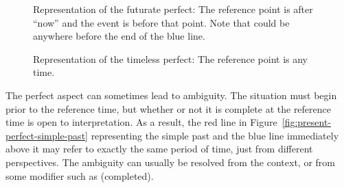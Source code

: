 \begin{figure}
    \caption{Representation of the futurate perfect:  The reference point is after ``now'' and the event is before that point. Note that  could be anywhere before the end of the blue line.}
    \label{fig:futurate-perfect}
\end{figure}

\begin{figure}
    \caption{Representation of the timeless perfect:  The reference point is any time.}
    \label{fig:timeless-perfect}
\end{figure}

The perfect aspect can sometimes lead to ambiguity. The situation must begin prior to the reference time, but whether or not it is complete at the reference time is open to interpretation. As a result, the red line in Figure~\ref{fig:present-perfect-simple-past} representing the simple past and the blue line immediately above it may refer to exactly the same period of time, just from different perspectives. The ambiguity can usually be resolved from the context, or from some modifier such as  (completed).

